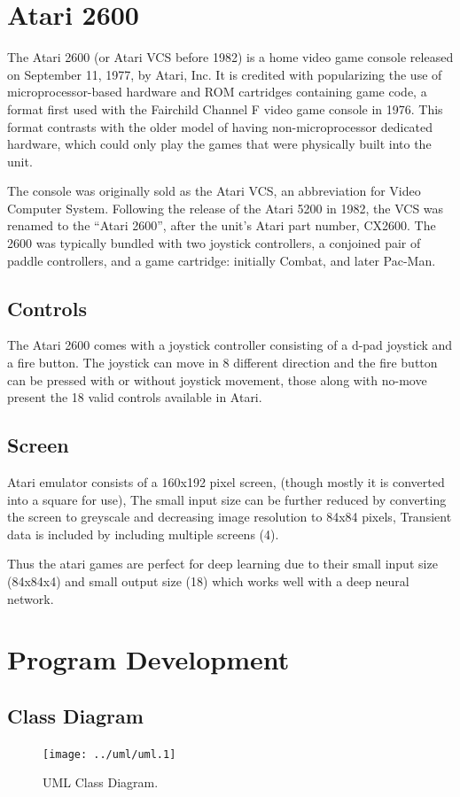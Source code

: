 \documentclass[a4paper,11pt]{report}
\begin{document}
		\section{Atari 2600}
		The Atari 2600 (or Atari VCS before 1982) is a home video game console released on September 11, 1977, by Atari, Inc. It is credited with popularizing the use of microprocessor-based hardware and ROM cartridges containing game code, a format first used with the Fairchild Channel F video game console in 1976. This format contrasts with the older model of having non-microprocessor dedicated hardware, which could only play the games that were physically built into the unit.

		The console was originally sold as the Atari VCS, an abbreviation for Video Computer System. Following the release of the Atari 5200 in 1982, the VCS was renamed to the ``Atari 2600'', after the unit's Atari part number, CX2600. The 2600 was typically bundled with two joystick controllers, a conjoined pair of paddle controllers, and a game cartridge: initially Combat, and later Pac-Man.
		\subsection{Controls}
		The Atari 2600 comes with a joystick controller consisting of a d-pad joystick and a fire button. The joystick can move in 8 different direction and the fire button can be pressed with or without joystick movement, those along with no-move present the 18 valid controls available in Atari.

		\subsection{Screen}
		Atari emulator consists of a 160x192 pixel screen, (though mostly it is converted into a square for use), The small input size can be further reduced by converting the screen to greyscale and decreasing image resolution to 84x84 pixels, Transient data is included by including multiple screens (4). 

		Thus the atari games are perfect for deep learning due to their small input size (84x84x4) and small output size (18) which works well with a deep neural network.
		
		\newpage
		\section{Program Development}
			\subsection{Class Diagram}
				\begin{figure}[H]
					\begin{centering}
						\texttt{[image: ../uml/uml.1]}\\
						\caption{UML Class Diagram.}
					\end{centering}
				\end{figure}
\end{document}
